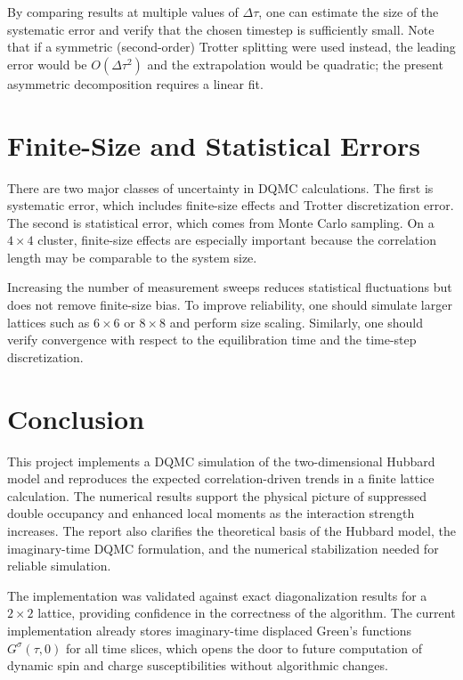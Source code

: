 \documentclass[9pt,a4paper,twocolumn,twoside]{rho-class/rho}
\begin{document}
By comparing results at multiple values of $\Delta\tau$, one can estimate the size of the systematic error and verify that the chosen timestep is sufficiently small. Note that if a symmetric (second-order) Trotter splitting were used instead, the leading error would be $O(\Delta\tau^2)$ and the extrapolation would be quadratic; the present asymmetric decomposition requires a linear fit.

\section{Finite-Size and Statistical Errors}

There are two major classes of uncertainty in DQMC calculations. The first is systematic error, which includes finite-size effects and Trotter discretization error. The second is statistical error, which comes from Monte Carlo sampling. On a $4\times4$ cluster, finite-size effects are especially important because the correlation length may be comparable to the system size.

Increasing the number of measurement sweeps reduces statistical fluctuations but does not remove finite-size bias. To improve reliability, one should simulate larger lattices such as $6\times6$ or $8\times8$ and perform size scaling. Similarly, one should verify convergence with respect to the equilibration time and the time-step discretization.

\section{Conclusion}

This project implements a DQMC simulation of the two-dimensional Hubbard model and reproduces the expected correlation-driven trends in a finite lattice calculation. The numerical results support the physical picture of suppressed double occupancy and enhanced local moments as the interaction strength increases. The report also clarifies the theoretical basis of the Hubbard model, the imaginary-time DQMC formulation, and the numerical stabilization needed for reliable simulation.

The implementation was validated against exact diagonalization results for a $2\times2$ lattice, providing confidence in the correctness of the algorithm. The current implementation already stores imaginary-time displaced Green's functions $G^\sigma(\tau, 0)$ for all time slices, which opens the door to future computation of dynamic spin and charge susceptibilities without algorithmic changes.
\end{document}
